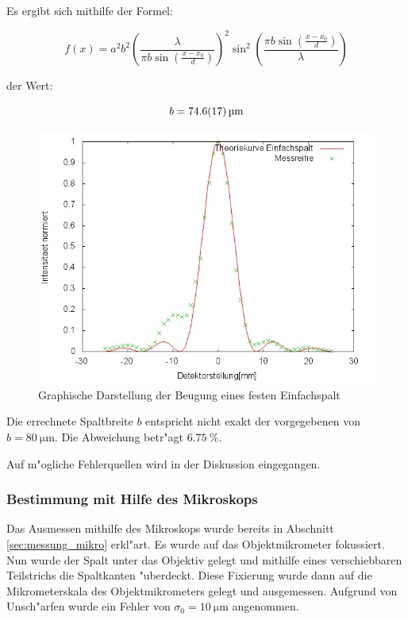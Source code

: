 			Es ergibt sich mithilfe der Formel:

			\begin{equation}
				f(x) = a^2 b^2 \left(\frac{\lambda}{\pi b \sin(\frac{x-x_\mathrm{0}}{d})}\right)^2 \sin^2 \left( \frac{\pi b \sin(\frac{x-x_\mathrm{0}}{d})}{\lambda} \right)
			\end{equation}

			der Wert:

			\begin{equation}
				b = \SI{74.6 (17)}{\micro \meter}
			\end{equation}

			

			\begin{figure}[H]
				\centering
				\includegraphics[width = 14cm]{graph1.jpg}
				\caption{Graphische Darstellung der Beugung eines festen Einfachspalt}
				\label{graph1}
			\end{figure}

			Die errechnete Spaltbreite $b$ entspricht nicht exakt der vorgegebenen von $b = \SI{80}{\micro \meter}$. Die Abweichung betr"agt $\SI{6.75}{\percent}$.

			Auf m"ogliche Fehlerquellen wird in der Diskussion eingegangen.
			\newpage

		\subsubsection{Bestimmung mit Hilfe des Mikroskops}
			\label{sub:Bestimmung_mit_Hilfe_des_mikroskops}

			Das Ausmessen mithilfe des Mikroskops wurde bereits in Abschnitt \ref{sec:messung_mikro} erkl"art.
			Es wurde auf das Objektmikrometer fokussiert. Nun wurde der Spalt unter das Objektiv gelegt und mithilfe eines verschiebbaren Teilstrichs die Spaltkanten "uberdeckt. Diese Fixierung wurde dann auf die Mikrometerskala des Objektmikrometers gelegt und ausgemessen.
			Aufgrund von Unsch"arfen wurde ein Fehler von $\sigma_0 = \SI{10}{\micro \meter}$ angenommen.

